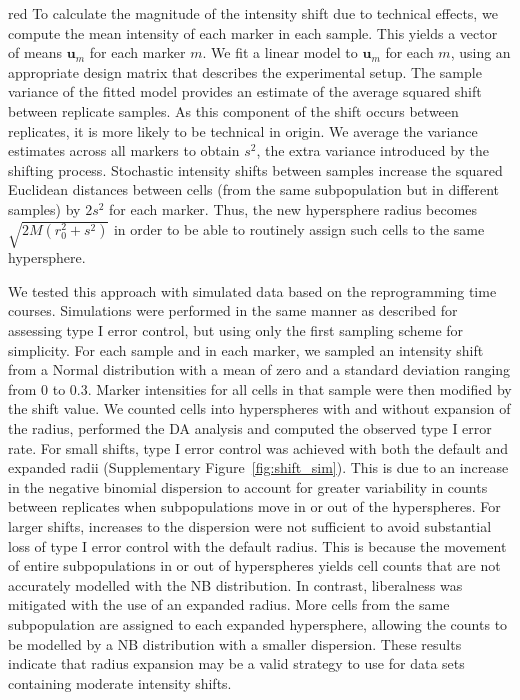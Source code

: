 \documentclass{article}
\begin{document}
\begin{color}{red}
To calculate the magnitude of the intensity shift due to technical effects, we compute the mean intensity of each marker in each sample.
This yields a vector of means $\mathbf{u}_m$ for each marker $m$.
We fit a linear model to $\mathbf{u}_m$ for each $m$, using an appropriate design matrix that describes the experimental setup.
The sample variance of the fitted model provides an estimate of the average squared shift between replicate samples.
As this component of the shift occurs between replicates, it is more likely to be technical in origin.
We average the variance estimates across all markers to obtain $s^2$, the extra variance introduced by the shifting process.
Stochastic intensity shifts between samples increase the squared Euclidean distances between cells (from the same subpopulation but in different samples) by $2s^2$ for each marker.
Thus, the new hypersphere radius becomes $\sqrt{2M(r_0^2 + s^2)}$ in order to be able to routinely assign such cells to the same hypersphere.


We tested this approach with simulated data based on the reprogramming time courses.
Simulations were performed in the same manner as described for assessing type I error control, but using only the first sampling scheme for simplicity.
For each sample and in each marker, we sampled an intensity shift from a Normal distribution with a mean of zero and a standard deviation ranging from 0 to 0.3.
Marker intensities for all cells in that sample were then modified by the shift value.
We counted cells into hyperspheres with and without expansion of the radius, performed the DA analysis and computed the observed type I error rate.
For small shifts, type I error control was achieved with both the default and expanded radii (Supplementary Figure~\ref{fig:shift_sim}).
This is due to an increase in the negative binomial dispersion to account for greater variability in counts between replicates when subpopulations move in or out of the hyperspheres.
For larger shifts, increases to the dispersion were not sufficient to avoid substantial loss of type I error control with the default radius.
This is because the movement of entire subpopulations in or out of hyperspheres yields cell counts that are not accurately modelled with the NB distribution.
In contrast, liberalness was mitigated with the use of an expanded radius.
More cells from the same subpopulation are assigned to each expanded hypersphere, allowing the counts to be modelled by a NB distribution with a smaller dispersion.
These results indicate that radius expansion may be a valid strategy to use for data sets containing moderate intensity shifts. 


\end{color}
\end{document}
